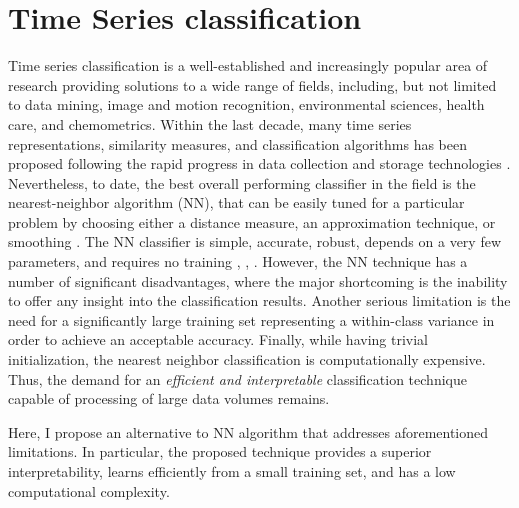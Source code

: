 \section{Time Series classification}
Time series classification is a well-established and increasingly popular area of research providing solutions to a wide 
range of fields, including, but not limited to data mining, image and motion recognition, environmental sciences, health care, 
and chemometrics. 
Within the last decade, many time series representations, similarity measures, and classification algorithms 
has been proposed following the rapid progress in data collection and storage technologies \cite{citeulike:10358271}. 
Nevertheless, to date, the best overall performing classifier in the field is the nearest-neighbor algorithm (NN), 
that can be easily tuned for a particular problem by choosing either a distance measure, an approximation technique, 
or smoothing \cite{citeulike:10358271}.
The NN classifier is simple, accurate, robust, depends on a very few parameters, and requires no training 
\cite{citeulike:10358271}, \cite{citeulike:532340}, \cite{citeulike:12563424}.
However, the NN technique has a number of significant disadvantages, where the major shortcoming is the 
inability to offer any insight into the classification results. 
Another serious limitation is the need for a significantly large training set representing a within-class 
variance in order to achieve an acceptable accuracy. 
Finally, while having trivial initialization, the nearest neighbor classification is computationally expensive. 
Thus, the demand for an \textit{efficient and interpretable} classification technique capable of processing of 
large data volumes remains.

Here, I propose an alternative to NN algorithm that addresses aforementioned limitations. 
In particular, the proposed technique provides a superior interpretability, learns efficiently from a small 
training set, and has a low computational complexity. 

